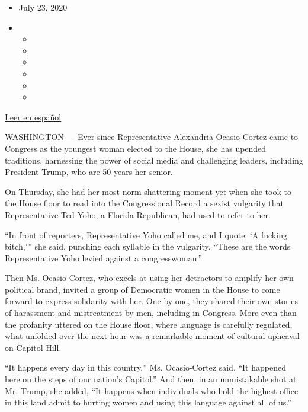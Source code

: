 \begin{itemize}
\item
  July 23, 2020
\item
  \begin{itemize}
  \item
  \item
  \item
  \item
  \item
  \item
  \end{itemize}
\end{itemize}

\href{https://www.nytimes3xbfgragh.onion/es/2020/07/24/espanol/estados-unidos/alexandria-ocasio-cortez-insulto.html}{Leer
en español}

WASHINGTON --- Ever since Representative Alexandria Ocasio-Cortez came
to Congress as the youngest woman elected to the House, she has upended
traditions, harnessing the power of social media and challenging
leaders, including President Trump, who are 50 years her senior.

On Thursday, she had her most norm-shattering moment yet when she took
to the House floor to read into the Congressional Record a
\href{https://www.nytimes3xbfgragh.onion/2020/07/23/us/politics/aoc-women-ted-yoho.html}{sexist
vulgarity} that Representative Ted Yoho, a Florida Republican, had used
to refer to her.

``In front of reporters, Representative Yoho called me, and I quote: `A
fucking bitch,''' she said, punching each syllable in the vulgarity.
``These are the words Representative Yoho levied against a
congresswoman.''

Then Ms. Ocasio-Cortez, who excels at using her detractors to amplify
her own political brand, invited a group of Democratic women in the
House to come forward to express solidarity with her. One by one, they
shared their own stories of harassment and mistreatment by men,
including in Congress. More even than the profanity uttered on the House
floor, where language is carefully regulated, what unfolded over the
next hour was a remarkable moment of cultural upheaval on Capitol Hill.

``It happens every day in this country,'' Ms. Ocasio-Cortez said. ``It
happened here on the steps of our nation's Capitol.'' And then, in an
unmistakable shot at Mr. Trump, she added, ``It happens when individuals
who hold the highest office in this land admit to hurting women and
using this language against all of us.''

